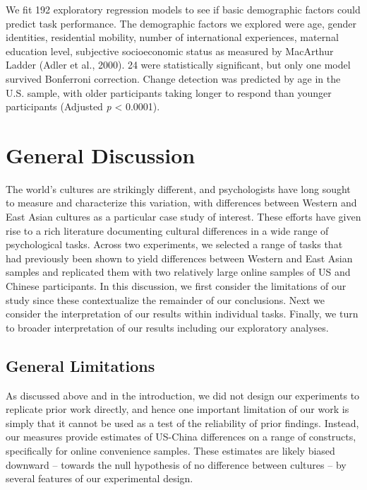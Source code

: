 \documentclass[
  man,floatsintext]{apa6}
\begin{document}
We fit 192 exploratory regression models to see if basic demographic factors could predict task performance. The demographic factors we explored were age, gender identities, residential mobility, number of international experiences, maternal education level, subjective socioeconomic status as measured by MacArthur Ladder (Adler et al., 2000). 24 were statistically significant, but only one model survived Bonferroni correction. Change detection was predicted by age in the U.S. sample, with older participants taking longer to respond than younger participants (Adjusted \emph{p} \textless{} 0.0001).

\hypertarget{general-discussion}{%
\section{General Discussion}\label{general-discussion}}

The world's cultures are strikingly different, and psychologists have long sought to measure and characterize this variation, with differences between Western and East Asian cultures as a particular case study of interest. These efforts have given rise to a rich literature documenting cultural differences in a wide range of psychological tasks. Across two experiments, we selected a range of tasks that had previously been shown to yield differences between Western and East Asian samples and replicated them with two relatively large online samples of US and Chinese participants. In this discussion, we first consider the limitations of our study since these contextualize the remainder of our conclusions. Next we consider the interpretation of our results within individual tasks. Finally, we turn to broader interpretation of our results including our exploratory analyses.

\hypertarget{general-limitations}{%
\subsection{General Limitations}\label{general-limitations}}

As discussed above and in the introduction, we did not design our experiments to replicate prior work directly, and hence one important limitation of our work is simply that it cannot be used as a test of the reliability of prior findings. Instead, our measures provide estimates of US-China differences on a range of constructs, specifically for online convenience samples. These estimates are likely biased downward -- towards the null hypothesis of no difference between cultures -- by several features of our experimental design.
\end{document}
